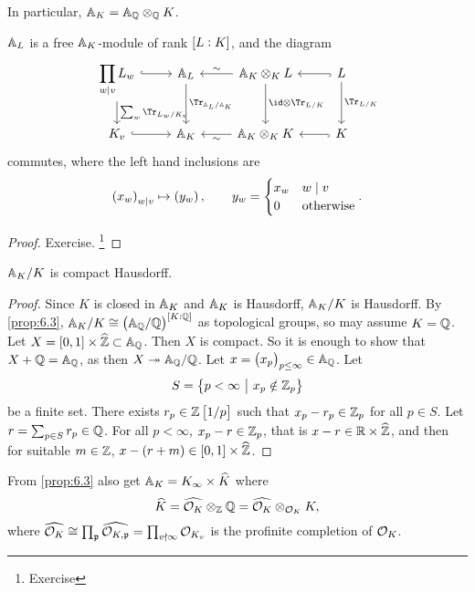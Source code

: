 In particular, $ \AA_K = \AA_\QQ \otimes_\QQ K $.

\pagebreak

\begin{corollary}
$ \AA_L $ is a free $ \AA_K $-module of rank $ \sbr{L : K} $, and the diagram
$$
\begin{tikzcd}
\displaystyle\prod_{w \mid v} L_w \arrow[hookrightarrow]{r} \arrow{d}{\sum_w \Tr_{L_w / K_v}} & \AA_L \arrow{d}{\Tr_{\AA_L / \AA_K}} & \AA_K \otimes_K L \arrow{l}[swap]{\sim} \arrow{d}{\id \otimes \Tr_{L / K}} & L \arrow[hookrightarrow]{l} \arrow{d}{\Tr_{L / K}} \\
K_v \arrow[hookrightarrow]{r} & \AA_K & \AA_K \otimes_K K \arrow{l}{\sim} & K \arrow[hookrightarrow]{l}
\end{tikzcd}
$$
commutes, where the left hand inclusions are
$$ \br{x_w}_{w \mid v} \mapsto \br{y_w}, \qquad y_w =
\begin{cases}
x_w & w \mid v \\
0 & \text{otherwise}
\end{cases}.
$$
\end{corollary}

\begin{proof}
Exercise. \footnote{Exercise}
\end{proof}

\begin{theorem}
$ \AA_K / K $ is compact Hausdorff.
\end{theorem}

\begin{proof}
Since $ K $ is closed in $ \AA_K $ and $ \AA_K $ is Hausdorff, $ \AA_K / K $ is Hausdorff. By \ref{prop:6.3}, $ \AA_K / K \cong \br{\AA_\QQ / \QQ}^{\sbr{K : \QQ}} $ as topological groups, so may assume $ K = \QQ $. Let $ X = \sbr{0, 1} \times \widehat{\ZZ} \subset \AA_\QQ $. Then $ X $ is compact. So it is enough to show that $ X + \QQ = \AA_\QQ $, as then $ X \twoheadrightarrow \AA_\QQ / \QQ $. Let $ x = \br{x_p}_{p \le \infty} \in \AA_\QQ $. Let
$$ S = \cbr{p < \infty \st x_p \notin \ZZ_p} $$
be a finite set. There exists $ r_p \in \ZZ\sbr{1 / p} $ such that $ x_p - r_p \in \ZZ_p $ for all $ p \in S $. Let $ r = \sum_{p \in S} r_p \in \QQ $. For all $ p < \infty $, $ x_p - r \in \ZZ_p $, that is $ x - r \in \RR \times \widehat{\ZZ} $, and then for suitable $ m \in \ZZ $, $ x - \br{r + m} \in \sbr{0, 1} \times \widehat{\ZZ} $.
\end{proof}

From \ref{prop:6.3} also get $ \AA_K = K_\infty \times \widehat{K} $ where
$$ \widehat{K} = \widehat{\OOO_K} \otimes_\ZZ \QQ = \widehat{\OOO_K} \otimes_{\OOO_K} K, $$
where $ \widehat{\OOO_K} \cong \prod_\ppp \widehat{\OOO_{K, \ppp}} = \prod_{v \nmid \infty} \OOO_{K_v} $ is the profinite completion of $ \OOO_K $.

